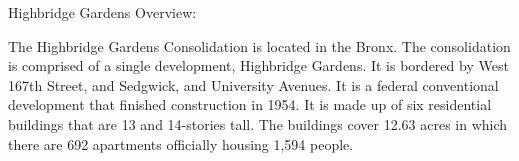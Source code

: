 Highbridge Gardens Overview:   

    

The Highbridge Gardens Consolidation is located in the Bronx. The consolidation is comprised of a single development, Highbridge Gardens. It is bordered by West 167th Street, and Sedgwick, and University Avenues. It is a federal conventional development that finished construction in 1954. It is made up of six residential buildings that are 13 and 14-stories tall. The buildings cover 12.63 acres in which there are 692 apartments officially housing 1,594 people.     